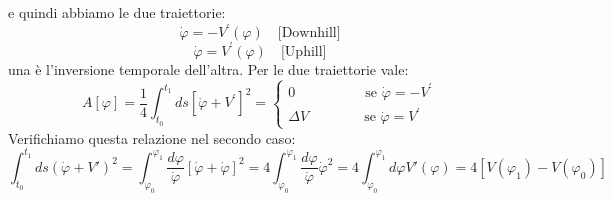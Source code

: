 e quindi abbiamo le due traiettorie:
\begin{equation}
\dot{\varphi}=-V^{\prime}(\varphi) \quad \text{[Downhill]}
\end{equation}
\begin{equation}
\dot{\varphi}=V^{\prime}(\varphi) \quad \text{[Uphill]}
\end{equation}
una è l'inversione temporale dell'altra.
Per le due traiettorie vale:
\begin{equation}
A[\varphi]=\frac{1}{4}\int_{t_{0}}^{t_{1}}ds[\dot{\varphi}+V^{\prime}]^{2} = \begin{cases} 0 \quad \quad \quad \quad \quad\text{se } \dot{\varphi}=-V^{\prime}\\ \Delta V \quad \quad \quad \quad \text{se } \dot{\varphi}=V^{\prime}\end{cases}
\end{equation}
Verifichiamo questa relazione nel secondo caso:
\begin{equation*}
\int_{t_0}^{t_1} ds (\dot{\varphi} + V')^2 = \int_{\varphi_0}^{\varphi_1} \frac{d\varphi}{\dot{\varphi}} [\dot{\varphi} + \dot{\varphi}]^2 = 4 \int_{\varphi_0}^{\varphi_1} \frac{d\varphi}{\dot{\varphi}} \dot{\varphi}^2 = 4 \int_{\varphi_0}^{\varphi_1} d\varphi V'(\varphi) = 4 [V(\varphi_1) - V(\varphi_0)] 
\end{equation*}